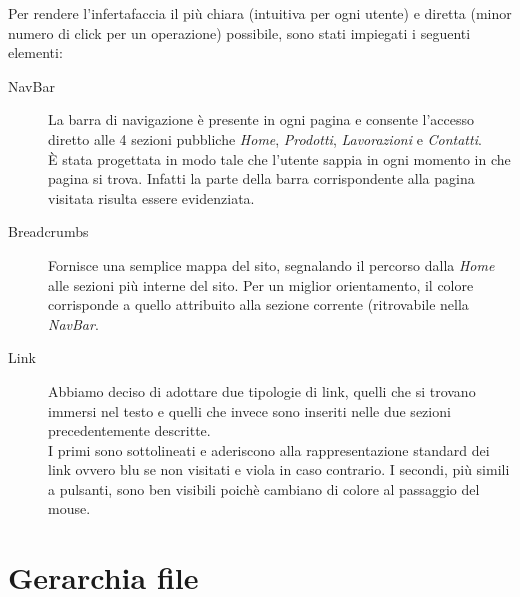 \documentclass[11pt]{article}
\begin{document}
Per rendere l'infertafaccia il più chiara (intuitiva per ogni utente) e diretta (minor numero di click per un operazione) possibile, sono stati impiegati i seguenti elementi:
\begin{description}
	\item [NavBar] La barra di navigazione è presente in ogni pagina e consente l'accesso diretto alle 4 sezioni pubbliche \textit{Home}, \textit{Prodotti}, \textit{Lavorazioni} e \textit{Contatti}.
	\\È stata progettata in modo tale che l'utente sappia in ogni momento in che pagina si trova. Infatti la parte della barra corrispondente alla pagina visitata risulta essere evidenziata.
	\item [Breadcrumbs] Fornisce una semplice mappa del sito, segnalando il percorso dalla \textit{Home} alle sezioni più interne del sito. Per un miglior orientamento, il colore corrisponde a quello attribuito alla sezione corrente (ritrovabile nella \textit{NavBar}.
	\item [Link] Abbiamo deciso di adottare due tipologie di link, quelli che si trovano immersi nel testo e quelli che invece sono inseriti nelle due sezioni precedentemente descritte.
	\\ I primi sono sottolineati e aderiscono alla rappresentazione standard dei link ovvero blu se non visitati e viola in caso contrario. I secondi, più simili a pulsanti, sono ben visibili poichè cambiano di colore al passaggio del mouse.
\end{description}

\newpage
\section{Gerarchia file}
\end{document}
